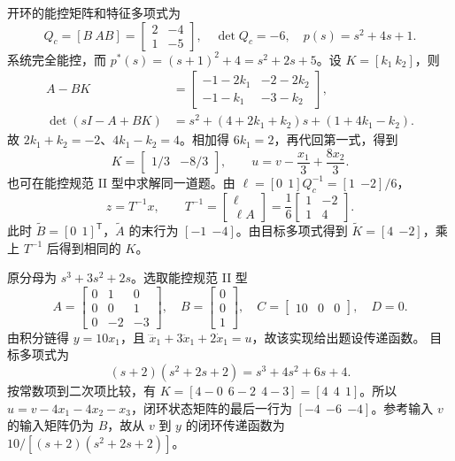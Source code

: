 \sol 开环的能控矩阵和特征多项式为
\[
    Q_c=[B\ AB]=\begin{bmatrix}2&-4\\1&-5\end{bmatrix},\quad
    \det Q_c=-6,\quad p(s)=s^2+4s+1 .
\]
系统完全能控，而 $p^\ast(s)=(s+1)^2+4=s^2+2s+5$。设 $K=[k_1\ k_2]$，则
\[
\begin{aligned}
    A-BK&=\begin{bmatrix}-1-2k_1&-2-2k_2\\-1-k_1&-3-k_2\end{bmatrix},\\
    \det(sI-A+BK)&=s^2+(4+2k_1+k_2)s+(1+4k_1-k_2).
\end{aligned}
\]
故 $2k_1+k_2=-2$、$4k_1-k_2=4$。相加得 $6k_1=2$，再代回第一式，得到
\[
    \boxed{K=\begin{bmatrix}1/3&-8/3\end{bmatrix}},\qquad
    u=v-\frac{x_1}{3}+\frac{8x_2}{3}.
\]
也可在能控规范 II 型中求解同一道题。由 $\ell=[0\ \ 1]Q_c^{-1}=[1\ \ {-2}]/6$，
\[
    z=T^{-1}x,\qquad T^{-1}=\begin{bmatrix}\ell\\ \ell A\end{bmatrix}
          =\frac16\begin{bmatrix}1&-2\\1&4\end{bmatrix}.
\]
此时 $\widetilde B=[0\ \ 1]^{\mathsf T}$，$\widetilde A$ 的末行为 $[-1\ \ {-4}]$。由目标多项式得到 $\widetilde K=[4\ \ {-2}]$，乘上 $T^{-1}$ 后得到相同的 $K$。



\sol 原分母为 $s^3+3s^2+2s$。选取能控规范 II 型
\[
    A=\begin{bmatrix}0&1&0\\0&0&1\\0&-2&-3\end{bmatrix},\quad
    B=\begin{bmatrix}0\\0\\1\end{bmatrix},\quad
    C=\begin{bmatrix}10&0&0\end{bmatrix},\quad D=0 .
\]
由积分链得 $y=10x_1$，且 $\dddot x_1+3\ddot x_1+2\dot x_1=u$，故该实现给出题设传递函数。
目标多项式为
\[
    (s+2)(s^2+2s+2)=s^3+4s^2+6s+4 .
\]
按常数项到二次项比较，有 $K=[4-0\ \ 6-2\ \ 4-3]=[4\ \ 4\ \ 1]$。所以 $u=v-4x_1-4x_2-x_3$，闭环状态矩阵的最后一行为 $[-4\ \ {-6}\ \ {-4}]$。参考输入 $v$ 的输入矩阵仍为 $B$，故从 $v$ 到 $y$ 的闭环传递函数为 $10/[(s+2)(s^2+2s+2)]$。

